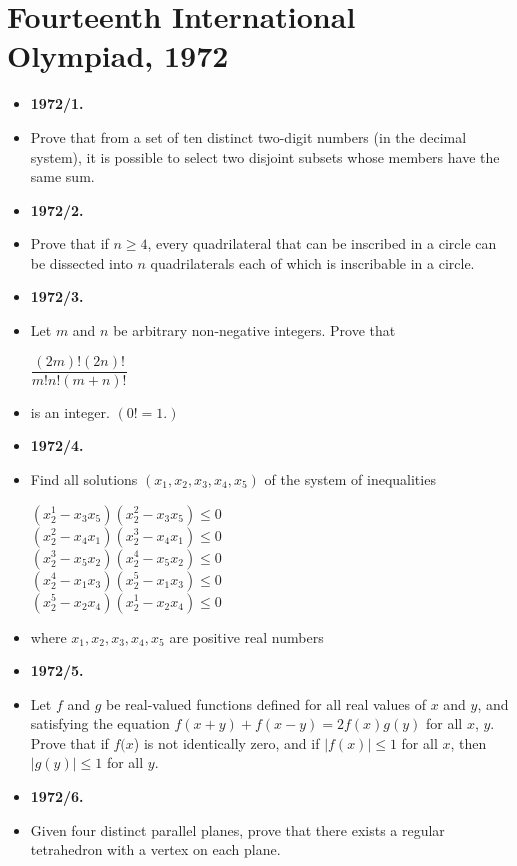 \documentclass[a4paper,12pt]{article}
\begin{document}
\section*{\textbf{\Large Fourteenth International Olympiad, 1972}}
\begin{itemize}[label={},leftmargin=0pt]
	 \item \textbf{\large 1972/1.}
	 \item Prove that from a set of ten distinct two-digit numbers (in the decimal system), it is possible to select two disjoint subsets whose members have the same sum.
	 \item \textbf{\large 1972/2.}
	 \item Prove that if $n \geq 4$, every quadrilateral that can be inscribed in a circle can be dissected into $n$ quadrilaterals each of which is inscribable in a circle.
	 \item \textbf{\large 1972/3.}
	 \item Let $m$ and $n$ be arbitrary non-negative integers. Prove that
	\begin{center}	 
		$\dfrac{(2m)!(2n)!}{m!n!(m + n)!}$
	\end{center}
	\item is an integer. $(0! = 1.)$
	\item \textbf{\large 1972/4.}
	\item Find all solutions $(x_1, x_2, x_3, x_4, x_5)$ of the system of inequalities
	\begin{center}
$(x_2^1 - x_3 x_5)(x_2^2 - x_3 x_5)  \leq  0$ \\
$(x_2^2 - x_4 x_1)(x_2^3 - x_4 x_1)  \leq  0$ \\
$(x_2^3 - x_5 x_2)(x_2^4 - x_5 x_2)  \leq  0 $ \\
$(x_2^4 - x_1 x_3)(x_2^5 - x_1 x_3)  \leq  0 $ \\
$(x_2^5 - x_2 x_4)(x_2^1 - x_2 x_4)  \leq  0 $

	\end{center}
\item where $x_1, x_2, x_3, x_4, x_5 $ are positive real numbers
\item \textbf{\large 1972/5.}
\item Let $f$ and $g$ be real-valued functions defined for all real values of $x$ and $y$, and satisfying the equation
$f(x + y) + f(x - y) = 2f(x)g(y)$
for all $x$, $y$. Prove that if $f(x$) is not identically zero, and if $|f(x)| \leq 1$ for all $x$, then $|g(y)| \leq 1$ for all $y$.
\item \textbf{\large 1972/6.}
\item Given four distinct parallel planes, prove that there exists a regular tetrahedron with a vertex on each plane.
\end{itemize}
\newpage
\end{document}
